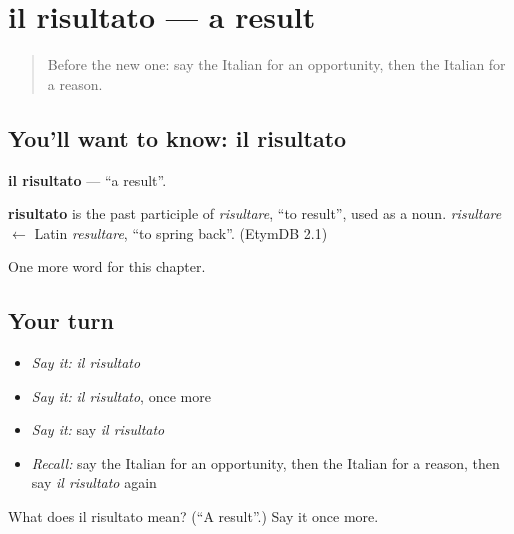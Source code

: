 \section[il risultato]{il risultato — a result}

\label{lesson:IT-C225-risultato}



\begin{quote}
Before the new one: say the Italian for an opportunity, then the Italian for a reason.
\end{quote}

\subsection*{You'll want to know: il risultato}
\textbf{il risultato} — \textquotedblleft{}a result\textquotedblright{}.

\begin{cousinweb}
\textbf{risultato} is the past participle of \emph{risultare}, \textquotedblleft{}to result\textquotedblright{}, used as a noun. \emph{risultare} $\leftarrow$ Latin \emph{resultare}, \textquotedblleft{}to spring back\textquotedblright{}. (EtymDB 2.1)
\end{cousinweb}

\begin{grammarlens}[title={What you've built}]
One more word for this chapter.
\end{grammarlens}

\subsection*{Your turn}
\begin{itemize}
\raggedright
  \item \emph{Say it:} \emph{il risultato}
  \item \emph{Say it:} \emph{il risultato}, once more
  \item \emph{Say it:} say \emph{il risultato}
  \item \emph{Recall:} say the Italian for an opportunity, then the Italian for a reason, then say \emph{il risultato} again
\end{itemize}

\begin{tcolorbox}[breakable,colback=teal!4,colframe=teal!35!black,title={Before you move on}]
What does il risultato mean? (\textquotedblleft{}A result\textquotedblright{}.) Say it once more.
\end{tcolorbox}
